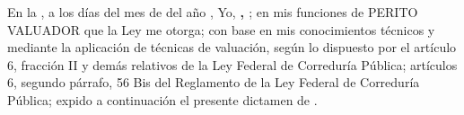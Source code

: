 
En la \lugarInforme{}, a los \numberstringnum{\diainforme} d\'ias del mes de \monthname[\mesinforme] del a\~no \numberstringnum{\annoinforme}, Yo, \textbf{\textcolor{principal}{\nombrePerito, \descripcionPerito}}; en mis funciones de PERITO VALUADOR que la Ley  me otorga; con base en mis conocimientos t\'ecnicos y mediante la aplicaci\'on de t\'ecnicas de valuaci\'on, seg\'un lo dispuesto por el art\'iculo 6, fracci\'on II y dem\'as relativos de la Ley Federal de Corredur\'ia P\'ublica; art\'iculos 6, segundo p\'arrafo, 56 Bis del Reglamento de la Ley Federal de Corredur\'ia P\'ublica; expido a continuaci\'on el presente dictamen de \tipoAvaluo.

